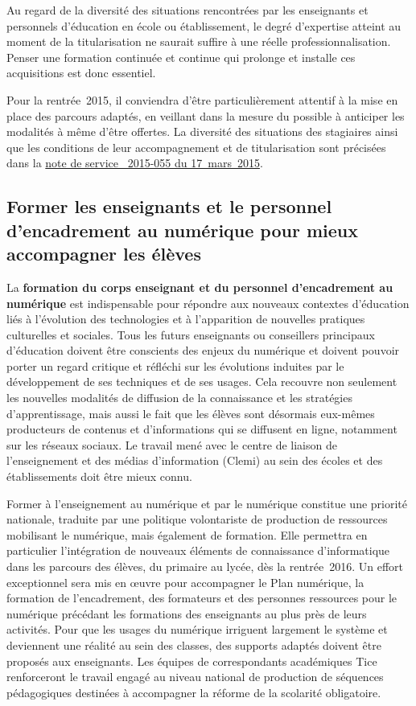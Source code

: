 Au regard de la diversité des situations rencontrées par les enseignants et personnels d’éducation en école ou établissement, le degré d’expertise atteint au moment de la titularisation ne saurait suffire à une réelle professionnalisation. Penser une formation continuée et continue qui prolonge et installe ces acquisitions est donc essentiel.

Pour la rentrée~2015, il conviendra d’être particulièrement attentif à la mise en place des parcours adaptés, en veillant dans la mesure du possible à anticiper les modalités à même d’être offertes. La diversité des situations des stagiaires ainsi que les conditions de leur accompagnement et de titularisation sont précisées dans la \href{http://www.education.gouv.fr/pid25535/bulletin_officiel.html?cid_bo=87000}{note de service \no{}~2015-055 du 17~mars~2015}.

\subsection{Former les enseignants et le personnel d’encadrement au numérique pour mieux accompagner les élèves}
La \textbf{formation du corps enseignant et du personnel d’encadrement au numérique} est indispensable pour répondre aux nouveaux contextes d’éducation liés à l’évolution des technologies et à l’apparition de nouvelles pratiques culturelles et sociales. Tous les futurs enseignants ou conseillers principaux d’éducation doivent être conscients des enjeux du numérique et doivent pouvoir porter un regard critique et réfléchi sur les évolutions induites par le développement de ses techniques et de ses usages. Cela recouvre non seulement les nouvelles modalités de diffusion de la connaissance et les stratégies d’apprentissage, mais aussi le fait que les élèves sont désormais eux-mêmes producteurs de contenus et d’informations qui se diffusent en ligne, notamment sur les réseaux sociaux. Le travail mené avec le centre de liaison de l’enseignement et des médias d’information (Clemi) au sein des écoles et des établissements doit être mieux connu.

Former à l’enseignement \og au numérique et par le numérique \fg{} constitue une priorité nationale, traduite par une politique volontariste de production de ressources mobilisant le numérique, mais également de formation. Elle permettra en particulier l’intégration de nouveaux éléments de connaissance d’informatique dans les parcours des élèves, du primaire au lycée, dès la rentrée~2016. Un effort exceptionnel sera mis en œuvre pour accompagner le Plan numérique, la formation de l’encadrement, des formateurs et des personnes ressources pour le numérique précédant les formations des enseignants au plus près de leurs activités. Pour que les usages du numérique irriguent largement le système et deviennent une réalité au sein des classes, des supports adaptés doivent être proposés aux enseignants. Les équipes de correspondants académiques Tice renforceront le travail engagé au niveau national de production de séquences pédagogiques destinées à accompagner la réforme de la scolarité obligatoire.

